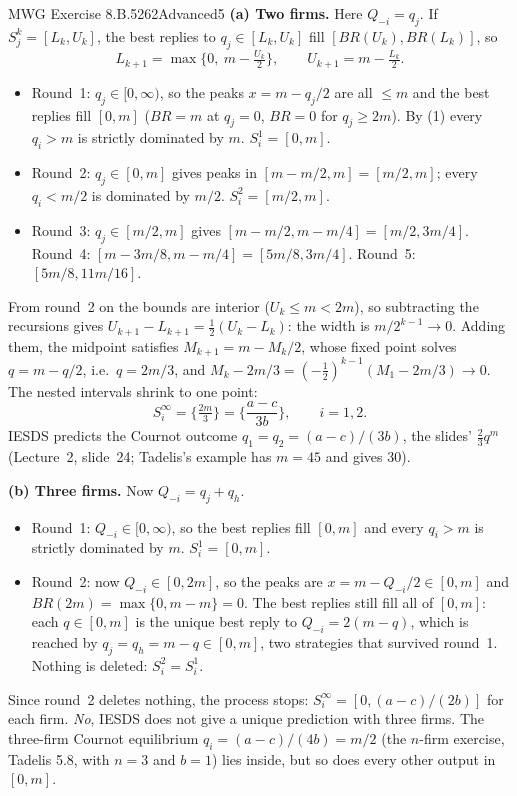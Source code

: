\begin{exsol}{MWG Exercise 8.B.5}{262}{Advanced}{5}
\textbf{(a) Two firms.} Here $Q_{-i} = q_j$. If $S_j^k = [L_k, U_k]$, the best replies to
$q_j \in [L_k, U_k]$ fill $[BR(U_k), BR(L_k)]$, so
\[
  L_{k+1} = \max\{0,\ m - \tfrac{U_k}{2}\}, \qquad U_{k+1} = m - \tfrac{L_k}{2}.
\]
\begin{itemize}
  \item Round~1: $q_j \in [0, \infty)$, so the peaks $x = m - q_j/2$ are all $\le m$ and the best
  replies fill $[0, m]$ ($BR = m$ at $q_j = 0$, $BR = 0$ for $q_j \ge 2m$). By (1) every
  $q_i > m$ is strictly dominated by $m$. $S_i^1 = [0, m]$.
  \item Round~2: $q_j \in [0, m]$ gives peaks in $[m - m/2, m] = [m/2, m]$; every $q_i < m/2$ is
  dominated by $m/2$. $S_i^2 = [m/2, m]$.
  \item Round~3: $q_j \in [m/2, m]$ gives $[m - m/2, m - m/4] = [m/2, 3m/4]$.
  Round~4: $[m - 3m/8, m - m/4] = [5m/8, 3m/4]$. Round~5: $[5m/8, 11m/16]$.
\end{itemize}
From round~2 on the bounds are interior ($U_k \le m < 2m$), so subtracting the recursions gives
$U_{k+1} - L_{k+1} = \tfrac12 (U_k - L_k)$: the width is $m/2^{k-1} \to 0$. Adding them, the
midpoint satisfies $M_{k+1} = m - M_k/2$, whose fixed point solves $q = m - q/2$, i.e.\
$q = 2m/3$, and $M_k - 2m/3 = (-\tfrac12)^{k-1}(M_1 - 2m/3) \to 0$. The nested intervals shrink to
one point:
\[
  S_i^\infty = \Big\{\tfrac{2m}{3}\Big\} = \Big\{\frac{a - c}{3b}\Big\}, \qquad i = 1, 2 .
\]
IESDS predicts the Cournot outcome $q_1 = q_2 = (a-c)/(3b)$, the slides' $\tfrac23 q^m$
(Lecture~2, slide~24; Tadelis's example has $m = 45$ and gives 30).

\textbf{(b) Three firms.} Now $Q_{-i} = q_j + q_h$.
\begin{itemize}
  \item Round~1: $Q_{-i} \in [0, \infty)$, so the best replies fill $[0, m]$ and every $q_i > m$
  is strictly dominated by $m$. $S_i^1 = [0, m]$.
  \item Round~2: now $Q_{-i} \in [0, 2m]$, so the peaks are $x = m - Q_{-i}/2 \in [0, m]$ and
  $BR(2m) = \max\{0, m - m\} = 0$. The best replies still fill all of $[0, m]$: each
  $q \in [0, m]$ is the unique best reply to $Q_{-i} = 2(m - q)$, which is reached by
  $q_j = q_h = m - q \in [0, m]$, two strategies that survived round~1. Nothing is deleted:
  $S_i^2 = S_i^1$.
\end{itemize}
Since round~2 deletes nothing, the process stops: $S_i^\infty = [0, (a-c)/(2b)]$ for each firm.
\emph{No}, IESDS does not give a unique prediction with three firms. The three-firm Cournot
equilibrium $q_i = (a-c)/(4b) = m/2$ (the $n$-firm exercise, Tadelis 5.8, with $n = 3$ and
$b = 1$) lies inside, but so does every other output in $[0, m]$.


\end{exsol}
